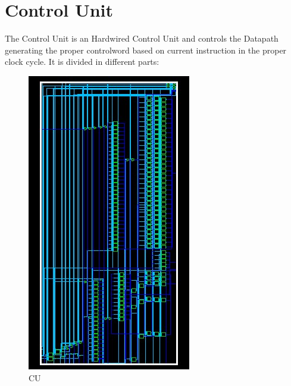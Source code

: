 \chapter{Control Unit}
\label{Control Unit}
The Control Unit is an Hardwired Control Unit and controls the Datapath generating the proper controlword based on current instruction in the proper clock cycle. It is divided in different parts:


\begin{figure}[h!]
    \centering
    \includegraphics[scale = 0.30]
    {chapters/figures/CU_highlevel}
    \caption{CU}
    \end{figure}


